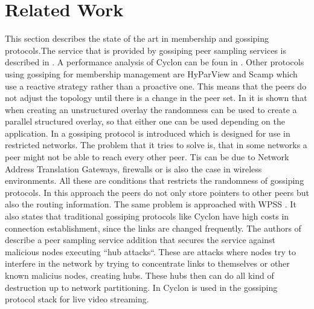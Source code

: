 \section{Related Work}
This section describes the state of the art in membership and gossiping
protocols.The service that is provided by gossiping peer sampling services is
described in \cite{jelasity2004peer}. A performance analysis of Cyclon can be
foun in \cite{Bonnet2006}. Other protocols using gossiping for membership
management are HyParView \cite{leitao2007hyparview} and Scamp \cite{ganesh2001scamp} which use a reactive strategy rather than a proactive
one. This means that the peers do not adjust the topology until there is a
change in the peer set. In \cite{maniymaran2007build} it is shown that when
creating an unstructured overlay the randomness can be used to create a
parallel structured overlay, so that either one can be used depending on the
application. In \cite{khelghatdoust2014gossip} a gossiping protocol is
introduced which is designed for use in restricted networks. The problem that
it tries to solve is, that in some networks a peer might not be able to reach
every other peer. Tis can be due to Network Address Translation Gateways,
firewalls or is also the case in wireless environments. All these are
conditions that restricts the randomness of gossiping protocols. In this
approach the peers do not only store pointers to other peers but also the
routing information. The same problem is approached with WPSS
\cite{roverso2013through}. It also states that traditional gossiping protocols
like Cyclon have high costs in connection establishment, since the links are
changed frequently. The authors of \cite{jesi2007identifying} describe a peer sampling service
addition that secures the service against malicious nodes executing ``hub
attacks``. These are attacks where nodes try to interfere in the network by
trying to concentrate links to themselves or other known malicius nodes,
creating hubs. These hubs then can do all kind of destruction up to network
partitioning. In \cite{matoslaystream} Cyclon is used in the gossiping protocol
stack for live video streaming.

